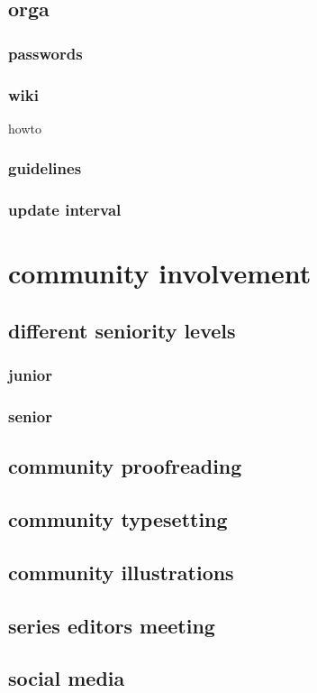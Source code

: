 \documentclass[output=guidelines,guidelines] {langscibook}
\begin{document}
\subsection{orga}
\subsubsection{passwords}
\subsubsection{wiki}
                    howto
\subsubsection{guidelines}
\subsubsection{update interval}
\section{community involvement}
\subsection{different seniority levels}
\subsubsection{junior}
\subsubsection{senior}
\subsection{community proofreading}
\subsection{community typesetting}
\subsection{community illustrations}
\subsection{series editors meeting}
\subsection{social media}
\end{document}
